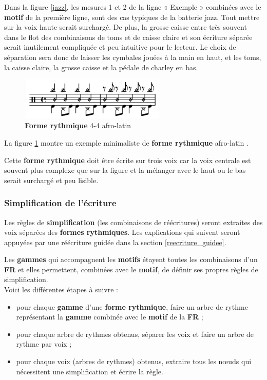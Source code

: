 Dans la figure \ref{jazz}, les mesures 1 et 2 de la ligne « Exemple » combinées
avec le \textbf{motif} de la première ligne, sont des cas typiques de la
batterie jazz. Tout mettre sur la voix haute serait surchargé. De plus, la
grosse caisse entre très souvent dans le flot des combinaisons de toms et de
caisse claire et son écriture séparée serait inutilement compliquée et peu
intuitive pour le lecteur. Le choix de séparation sera donc de laisser les
cymbales jouées à la main en haut, et les toms, la caisse claire, la grosse
caisse et la pédale de charley en bas.

\begin{figure}[h]
	\centering
	\includegraphics[height=20mm, width=70mm]{
    z_images/3_methodes/2_systemes/3_separation_afro-latins.png}
	\caption{\textbf{Forme rythmique} 4-4 afro-latin}
	\label{afro_latin}
\end{figure}

La figure \ref{afro_latin} montre un exemple minimaliste de
\textbf{forme rythmique} afro-latin \cite{system_drums}.

Cette \textbf{forme rythmique} doit être écrite sur trois voix car la voix
centrale est souvent plus complexe que sur la figure et la mélanger avec le
haut ou le bas serait surchargé et peu lisible.

\subsubsection{Simplification de l’écriture}

Les règles de \textbf{simplification} (les combinaisons de réécritures) seront
extraites des voix séparées des \textbf{formes rythmiques}.
Les explications qui suivent seront appuyées par une réécriture guidée dans la
section \ref{reecriture_guidee}.

Les \textbf{gammes} qui accompagnent les \textbf{motifs} étayent toutes les
combinaisons d’un \textbf{FR} et elles permettent, combinées avec le
\textbf{motif}, de définir ses propres règles de simplification.\\

Voici les différentes étapes à suivre :
\begin{itemize}
	\item pour chaque \textbf{gamme} d’une \textbf{forme rythmique}, faire un
        arbre de rythme représentant la \textbf{gamme} combinée avec le
        \textbf{motif} de la \textbf{FR} ;
	\item pour chaque arbre de rythmes obtenus, séparer les voix et faire un
        arbre de rythme par voix ;
	\item pour chaque voix (arbres de rythmes) obtenus, extraire tous les nœuds
        qui nécessitent une simplification et écrire la règle.\\
\end{itemize}

